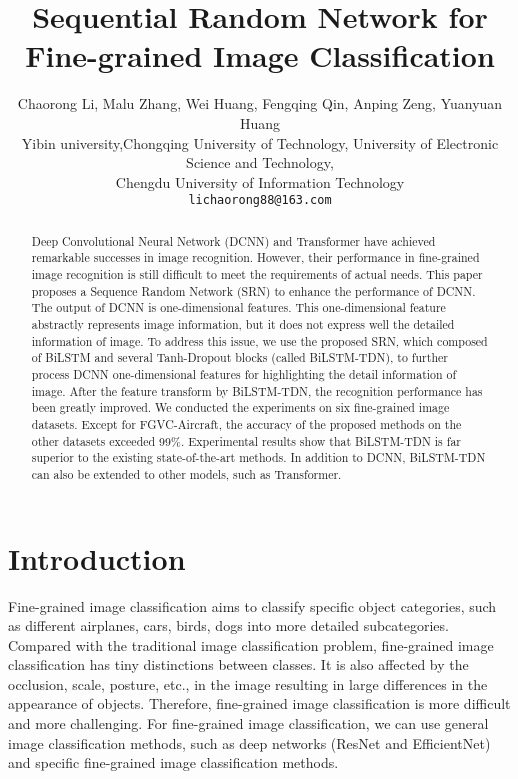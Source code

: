 \documentclass[10pt,twocolumn,letterpaper]{article}
\begin{document}
	
\title{Sequential Random Network for Fine-grained Image Classification}
	
	\author{Chaorong Li, Malu Zhang, Wei Huang, Fengqing Qin, Anping Zeng, Yuanyuan Huang\\
		Yibin university,Chongqing University of Technology, University of Electronic Science and Technology,\\Chengdu University of Information Technology\\
		{\tt\small lichaorong88@163.com}
\and 
		{\tt\small }
	}
	\maketitle
\ificcvfinal\thispagestyle{empty}\fi
	
\begin{abstract}
	Deep Convolutional Neural Network (DCNN) and Transformer have achieved remarkable successes in image recognition. However, their performance in fine-grained image recognition is still difficult to meet the requirements of actual needs. This paper proposes a Sequence Random Network (SRN) to enhance the performance of DCNN. The output of DCNN is one-dimensional features. This one-dimensional feature abstractly represents image information, but it does not express well the detailed information of image. To address this issue, we use the proposed SRN, which composed of BiLSTM and several Tanh-Dropout blocks (called BiLSTM-TDN), to further process DCNN one-dimensional features for highlighting  the detail information of image. After the feature transform by BiLSTM-TDN, the recognition performance has been greatly improved. We conducted the experiments on six fine-grained image datasets. Except for FGVC-Aircraft, the accuracy of the proposed methods on the other datasets exceeded 99\%. Experimental results show that BiLSTM-TDN is far superior to the existing state-of-the-art methods. In addition to DCNN, BiLSTM-TDN can also be extended to other models, such as Transformer.
\end{abstract}						
\section{Introduction}
Fine-grained image classification aims to classify specific object categories, such as different airplanes, cars, birds, dogs into more detailed subcategories. Compared with the traditional image classification problem, fine-grained image classification has tiny distinctions between classes. It is also affected by the occlusion, scale, posture, etc., in the image resulting in large differences in the appearance of objects. Therefore, fine-grained image classification is more difficult and more challenging. For fine-grained image classification, we can use general image classification methods, such as deep networks (ResNet\cite{2018Learning} and EfficientNet\cite{2019EfficientNet}) and specific fine-grained image classification methods.
\end{document}
